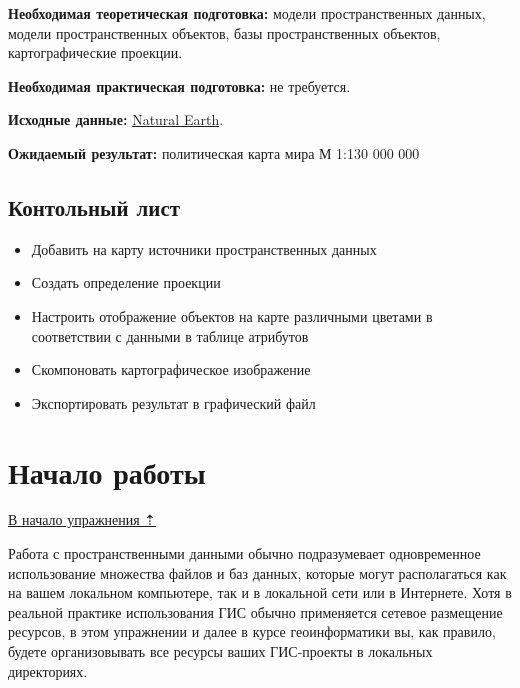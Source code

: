 \documentclass[
  12pt,
]{book}
\providecommand{\tightlist}{%
  \setlength{\itemsep}{0pt}\setlength{\parskip}{0pt}}
\begin{document}
\textbf{Необходимая теоретическая подготовка:} модели пространственных данных, модели пространственных объектов, базы пространственных объектов, картографические проекции.

\textbf{Необходимая практическая подготовка:} не требуется.

\textbf{Исходные данные:} \href{https://www.naturalearthdata.com/}{Natural Earth}.

\textbf{Ожидаемый результат:} политическая карта мира М 1:130 000 000

\hypertarget{map-design-world-checklist}{%
\subsection{Контольный лист}\label{map-design-world-checklist}}

\begin{itemize}
\tightlist
\item
  Добавить на карту источники пространственных данных
\item
  Создать определение проекции
\item
  Настроить отображение объектов на карте различными цветами в соответствии с данными в таблице атрибутов
\item
  Скомпоновать картографическое изображение
\item
  Экспортировать результат в графический файл
\end{itemize}

\hypertarget{map-design-world-begin}{%
\section{Начало работы}\label{map-design-world-begin}}

\protect\hyperlink{map-design-world}{В начало упражнения ⇡}

Работа с пространственными данными обычно подразумевает одновременное использование множества файлов и баз данных, которые могут располагаться как на вашем локальном компьютере, так и в локальной сети или в Интернете. Хотя в реальной практике использования ГИС обычно применяется сетевое размещение ресурсов, в этом упражнении и далее в курсе геоинформатики вы, как правило, будете организовывать все ресурсы ваших ГИС-проекты в локальных директориях.
\end{document}

